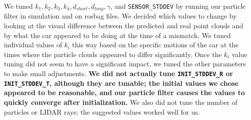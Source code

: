 We tuned $k_1, k_2, k_3, k_4, d_{short}, d_{long}, \gamma$, and \texttt{SENSOR\_STDDEV} by running our particle filter in simulation and on rosbag files. We decided which values to change by looking at the visual difference between the predicted and real point clouds and by what the car appeared to be doing at the time of a mismatch. We tuned individual values of $k_i$ this way based on the specific motions of the car at the times where the particle clouds appeared to differ significantly. Once the $k_i$ value tuning did not seem to have a significant impact, we tuned the other parameters to make small adjustments.  \textbf{We did not actually tune \texttt{INIT\_STDDEV\_R} or \texttt{INIT\_STDDEV\_T}, although they are tunable; the initial values we chose appeared to be reasonable, and our particle filter causes the values to quickly converge after initialization.} We also did not tune the number of particles or LIDAR rays; the suggested values worked well for us.
